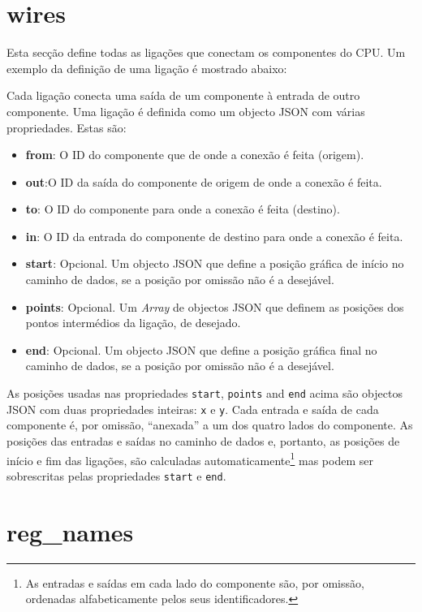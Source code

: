 \documentclass[11pt,a4paper,twoside,titlepage]{report}
\begin{document}
\section{wires}

Esta secção define todas as ligações que conectam os componentes do CPU.
Um exemplo da definição de uma ligação é mostrado abaixo:



Cada ligação conecta uma saída de um componente à entrada de outro componente.
Uma ligação é definida como um objecto JSON com várias propriedades.
Estas são:

\begin{itemize}
	\item \textbf{from}: O ID do componente que de onde a conexão é feita (origem).
	\item \textbf{out}:O ID da saída do componente de origem de onde a conexão é
		feita.
	\item \textbf{to}: O ID do componente para onde a conexão é feita (destino).
	\item \textbf{in}: O ID da entrada do componente de destino para onde a conexão
		é feita.
	\item \textbf{start}: Opcional. Um objecto JSON que define a posição gráfica
		de início no caminho de dados, se a posição por omissão não é a desejável.
	\item \textbf{points}: Opcional. Um \emph{Array} de objectos JSON que definem
		as posições dos pontos intermédios da ligação, de desejado.
	\item \textbf{end}: Opcional. Um objecto JSON que define a posição gráfica
		final no caminho de dados, se a posição por omissão não é a desejável.
\end{itemize}

As posições usadas nas propriedades \verb+start+, \verb+points+ and \verb+end+
acima são objectos JSON com duas propriedades inteiras: \verb+x+ e \verb+y+.
Cada entrada e saída de cada componente é, por omissão, ``anexada'' a um dos
quatro lados do componente.
As posições das entradas e saídas no caminho de dados e, portanto, as posições
de início e fim das ligações, são calculadas automaticamente\footnote{As
entradas e saídas em cada lado do componente são, por omissão, ordenadas
alfabeticamente pelos seus identificadores.} mas podem ser sobrescritas pelas
propriedades \verb+start+ e \verb+end+.


\section{reg\_names}
\end{document}
